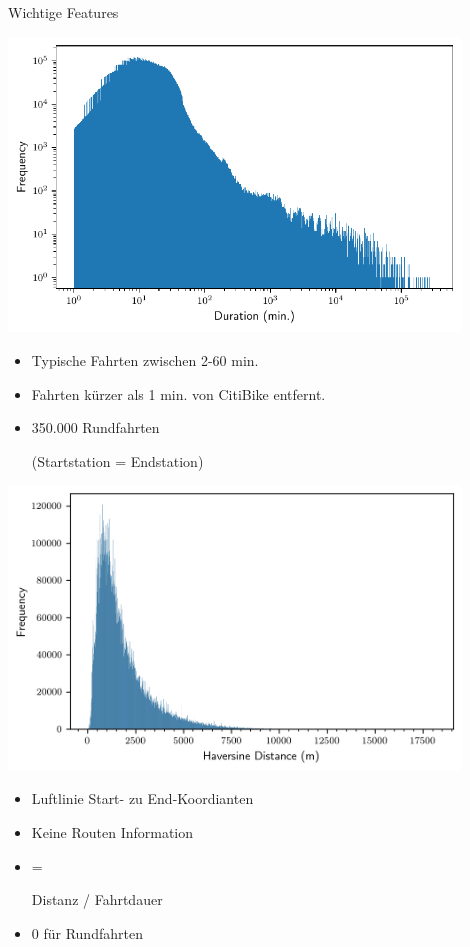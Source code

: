 \begin{frame}{Wichtige Features}
{
\centering
\includegraphics[width=0.9\textwidth]{../Images/Tripduration}
\begin{itemize}
\item<1> Typische Fahrten zwischen 2-60 min.
\item<1> Fahrten kürzer als 1 min. von CitiBike entfernt.
\item<1> 350.000 Rundfahrten

(Startstation = Endstation)
\end{itemize}
}
{
\includegraphics[width=0.9\textwidth]{../Images/Distance.png}
\begin{itemize}
\item Luftlinie Start- zu End-Koordianten
\item Keine Routen Information
\item {} =

 Distanz / Fahrtdauer
\item 0 für Rundfahrten
\end{itemize}
}
\end{frame}

